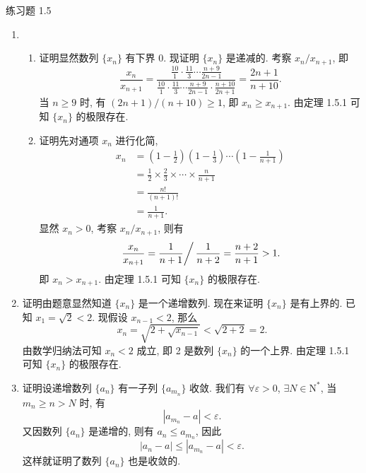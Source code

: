 



% 


\begin{center}
    {\heiti 练习题 1.5}
\end{center}

\begin{enumerate}
    \item 
        \begin{enumerate}[(1)]
            \item {\heiti 证明}\quad 显然数列 $\{x_n\}$ 有下界 $0$. 现证明 $\{x_n\}$ 是递减的. 考察 $x_n / x_{n+1}$, 即
                \[
                    \frac{x_n}{x_{n+1}} = \frac{\frac{10}{1}\cdot\frac{11}{3}\cdots\frac{n+9}{2n-1}}{\frac{10}{1}\cdot\frac{11}{3}\cdots\frac{n+9}{2n-1}\cdot\frac{n+10}{2n+1}} = \frac{2n+1}{n+10}.    
                \]
                当 $n \geqslant 9$ 时, 有 $(2n+1)/(n+10) \geqslant 1$, 即 $x_n \geqslant x_{n+1}$. 由定理 1.5.1 可知 $\{x_n\}$ 的极限存在.
            \item {\heiti 证明}\quad 先对通项 $x_n$ 进行化简,
                \begin{align*}
                    x_n &= \left(1 - \frac12\right)\left(1 - \frac13\right)\cdots\left(1 - \frac{1}{n+1}\right) \\
                        &= \frac12 \times \frac23 \times \cdots \times \frac{n}{n+1} \\
                        &= \frac{n!}{(n+1)!} \\
                        &= \frac{1}{n+1}.    
                \end{align*}
                显然 $x_n > 0$, 考察 $x_n/x_{n+1}$, 则有
                \[
                    \left. \frac{x_n}{x_{n+1}} = \frac{1}{n+1} \right/ \frac{1}{n+2} = \frac{n+2}{n+1} > 1.    
                \]
                即 $x_n > x_{n+1}$. 由定理 1.5.1 可知 $\{x_n\}$ 的极限存在.
        \end{enumerate}
    \item {\heiti 证明}\quad 由题意显然知道 $\{x_n\}$ 是一个递增数列. 现在来证明 $\{x_n\}$ 是有上界的.
        已知 $x_1 = \sqrt{2} < 2$. 现假设 $x_{n - 1} < 2$, 那么
        \[
            x_n = \sqrt{2 + \sqrt{x_{n-1}}} < \sqrt{2 + 2} = 2.    
        \]
        由数学归纳法可知 $x_n < 2$ 成立, 即 2 是数列 $\{x_n\}$ 的一个上界. 由定理 1.5.1 可知 $\{x_n\}$ 的极限存在.
    \item {\heiti 证明}\quad 设递增数列 $\{a_n\}$ 有一子列 $\{a_{m_n}\}$ 收敛.
        我们有 $\forall \varepsilon > 0$, $\exists N \in \mathrm{N}^*$, 当 $m_n \geqslant n > N$ 时, 有
        \[
            |a_{m_n} - a| < \varepsilon.    
        \]
        又因数列 $\{a_n\}$ 是递增的, 则有 $a_n \leqslant a_{m_n}$, 因此
        \[
            |a_n - a| \leqslant |a_{m_n} - a| < \varepsilon.    
        \]
        这样就证明了数列 $\{a_n\}$ 也是收敛的.


\end{enumerate}
